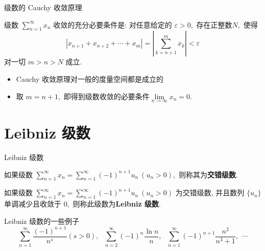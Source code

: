 \begin{frame}{级数的 Cauchy 收敛原理}

\begin{thm}
级数 $\sum\limits_{n=1}^\infty x_n$ 收敛的充分必要条件是: 对任意给定的 $\varepsilon > 0,$ 存在正整数$N,$ 使得
\[
\left\lvert x_{n+1} + x_{n+2} + \cdots + x_m \right\rvert = \left\lvert \sum\limits_{k=n+1}^m x_k \right\rvert < \varepsilon
\]
对一切 $m > n > N$ 成立.
\end{thm}

\pause
\vspace{0.6em}

\begin{attnblock}
\begin{itemize}
\item[\ding{43}] Cauchy 收敛原理对一般的度量空间都是成立的
\pause
\item[\ding{43}] 取 $m = n + 1,$ 即得到级数收敛的必要条件$\lim\limits_{n\to\infty} x_n = 0.$
\end{itemize}
\end{attnblock}

\end{frame}


\section[Leibniz\\级数]{Leibniz 级数}


\begin{frame}{Leibniz 级数}

\begin{Def}[交错级数]
如果级数 $\sum\limits_{n=1}^\infty x_n = \sum\limits_{n=1}^\infty (-1)^{n+1} u_n ~ (u_n > 0),$ 则称其为\textbf{交错级数}.
\end{Def}

\pause

\begin{Def}[Leibniz 级数]
如果级数 $\sum\limits_{n=1}^\infty x_n = \sum\limits_{n=1}^\infty (-1)^{n+1} u_n ~ (u_n > 0)$ 为交错级数, 并且数列 $\{u_n\}$ 单调减少且收敛于 $0,$ 则称此级数为\textbf{Leibniz 级数}.
\end{Def}

\pause

\begin{block}{Leibniz 级数的一些例子}
\vspace{-1em}
\[\sum\limits_{n=1}^\infty \dfrac{(-1)^{n+1}}{n^s} (s > 0), ~~~ \sum\limits_{n=2}^\infty (-1)^{n} \dfrac{\ln{n}}{n}, ~~~ \sum\limits_{n=1}^\infty (-1)^{n+1} \dfrac{n^2}{n^3 + 1}, ~~ \cdots\]
\end{block}

\end{frame}

